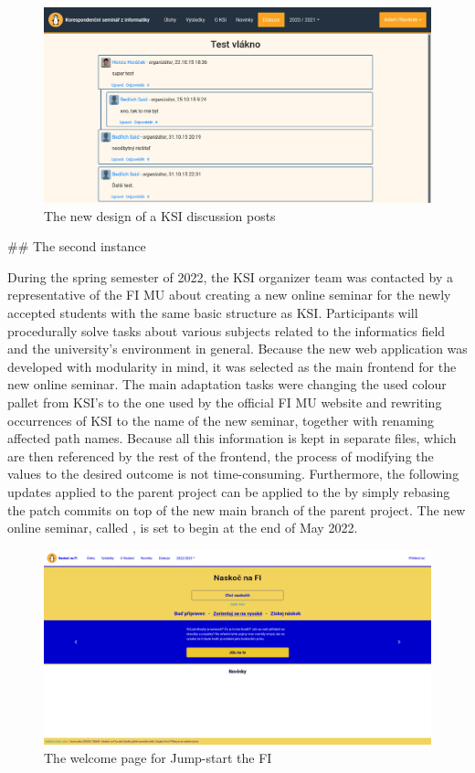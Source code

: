 \documentclass[
  digital, %
  oneside, %
  lof,     %
  nolot,     %
]{fithesis4}
\begin{document}
{\begin{figure}
\includegraphics[width=\textwidth]{assets/img/discussion-new}
\caption{The new design of a \acrshort{KSI} discussion posts}
\label{fig:discuss-new}
\end{figure}

## The second instance

During the spring semester of 2022, the \acrshort{KSI} organizer team was contacted by a representative of the \acrshort{FI} \acrshort{MU} about creating a new online seminar for the newly accepted students with the same basic structure as \acrshort{KSI}. Participants will procedurally solve tasks about various subjects related to the informatics field and the university's environment in general. Because the new web application was developed with modularity in mind, it was selected as the main frontend for the new online seminar. The main adaptation tasks were changing the used colour pallet from \acrshort{KSI}'s to the one used by the official \acrshort{FI} \acrshort{MU} website and rewriting occurrences of \acrshort{KSI} to the name of the new seminar, together with renaming affected path names. Because all this information is kept in separate files, which are then referenced by the rest of the frontend, the process of modifying the values to the desired outcome is not time-consuming. Furthermore, the following updates applied to the parent project can be applied to the  by simply rebasing the patch commits on top of the new main branch of the parent project. The new online seminar, called , is set to begin at the end of May 2022.

\begin{figure}
\includegraphics[width=\textwidth]{assets/img/naskoc-na-fi}
\caption{The welcome page for Jump-start the \acrshort{FI}}
\label{fig:naskoc-na-fi}
\end{figure}

}
\end{document}

